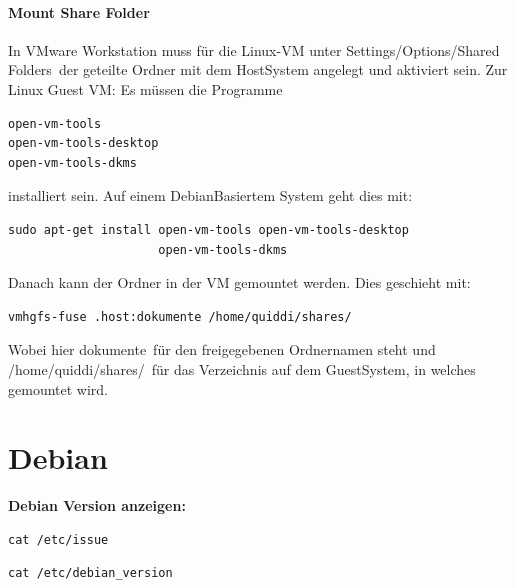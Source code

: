 \documentclass[11pt,fleqn]{book} %
\numberwithin{equation}{section} %
\numberwithin{figure}{section} %
\numberwithin{table}{section} %
\begin{document}
\subsubsection{Mount Share Folder}
In VMware Workstation muss für die Linux-VM unter \glqq Settings\slash Options\slash Shared Folders\grqq \ der geteilte Ordner mit dem HostSystem angelegt und aktiviert sein. Zur Linux Guest VM:
Es müssen die Programme 
\begin{lstlisting}
open-vm-tools
open-vm-tools-desktop
open-vm-tools-dkms
\end{lstlisting}
installiert sein. Auf einem DebianBasiertem System geht dies mit:
\begin{lstlisting}
sudo apt-get install open-vm-tools open-vm-tools-desktop
                     open-vm-tools-dkms
\end{lstlisting}
Danach kann der Ordner in der VM gemountet werden. Dies geschieht mit:
\begin{lstlisting}
vmhgfs-fuse .host:dokumente /home/quiddi/shares/
\end{lstlisting}
Wobei hier \glqq dokumente\grqq \ für den freigegebenen Ordnernamen steht und \glqq /home\slash quiddi\slash shares\slash \grqq \ für das Verzeichnis auf dem GuestSystem, in welches gemountet wird.
\chapter{Debian}
\textbf{Debian Version anzeigen:}
\begin{lstlisting}
cat /etc/issue
\end{lstlisting} 
\begin{lstlisting}
cat /etc/debian_version
\end{lstlisting}
\end{document}
